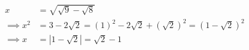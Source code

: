 \begin{align*}
x & = \sqrt{\sqrt{9}-\sqrt{8}}
\\
\implies
x^{2} 
& = 3 - 2\sqrt{2}
  = (1)^{2} - 2\sqrt{2} + (\sqrt{2})^{2}
  = (1 - \sqrt{2})^{2}
\\
\implies
x
& = |1 - \sqrt{2}|
  = \sqrt{2} - 1
\end{align*}

